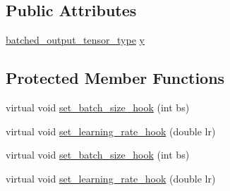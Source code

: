 \subsection*{Public Attributes}
\begin{DoxyCompactItemize}
\item 
\hyperlink{structbc_1_1nn_1_1Polymorphic__Layer__Base_a45ed57549be9c4e5c40c52168ca15ae9}{batched\+\_\+output\+\_\+tensor\+\_\+type} \hyperlink{structbc_1_1nn_1_1Polymorphic__Layer__Base_a6f05310307def656069b64a7fb7cbf91}{y}
\end{DoxyCompactItemize}
\subsection*{Protected Member Functions}
\begin{DoxyCompactItemize}
\item 
virtual void \hyperlink{structbc_1_1nn_1_1Polymorphic__Layer__Base_a21d145beb5e9f571e5e474171d47dff6}{set\+\_\+batch\+\_\+size\+\_\+hook} (int bs)
\item 
virtual void \hyperlink{structbc_1_1nn_1_1Polymorphic__Layer__Base_add15aef38db94de6066d048149723eea}{set\+\_\+learning\+\_\+rate\+\_\+hook} (double lr)
\item 
virtual void \hyperlink{structbc_1_1nn_1_1Polymorphic__Layer__Base_a21d145beb5e9f571e5e474171d47dff6}{set\+\_\+batch\+\_\+size\+\_\+hook} (int bs)
\item 
virtual void \hyperlink{structbc_1_1nn_1_1Polymorphic__Layer__Base_add15aef38db94de6066d048149723eea}{set\+\_\+learning\+\_\+rate\+\_\+hook} (double lr)
\end{DoxyCompactItemize}
